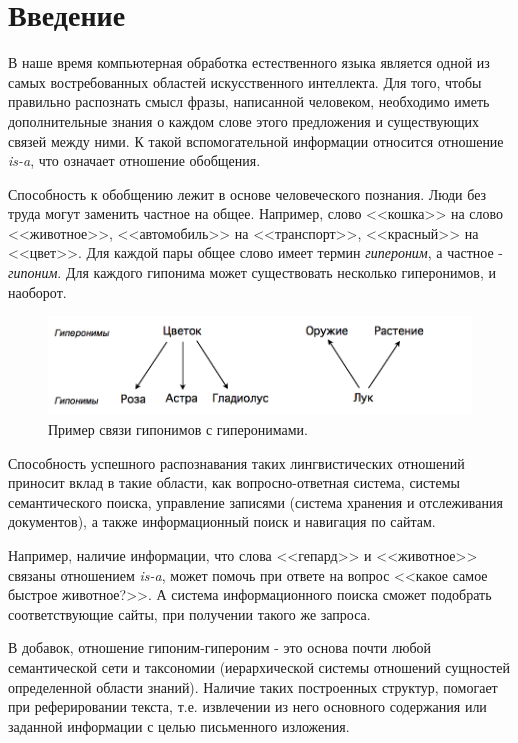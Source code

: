 \section*{Введение}
\label{sec:Introduction} 
\large 

В наше время компьютерная обработка естественного языка является одной из самых
востребованных областей искусственного интеллекта. Для того, чтобы правильно
распознать смысл фразы, написанной человеком, необходимо иметь дополнительные
знания о каждом слове этого предложения и существующих связей между ними. К такой
вспомогательной информации относится отношение \textit{is-a}, что означает отношение
обобщения.

Способность к обобщению лежит в основе человеческого познания. Люди без труда могут
заменить частное на общее. Например, слово <<кошка>> на слово <<животное>>,
<<автомобиль>> на <<транспорт>>, <<красный>> на <<цвет>>. Для каждой пары общее слово имеет
термин \textit{гипероним}, а частное - \textit{гипоним}. Для каждого гипонима может существовать
несколько гиперонимов, и наоборот.


\begin{figure}[ht]
\centering 
    \includegraphics[scale=0.6]{image/Example.png}
    \caption{Пример связи гипонимов с гиперонимами.}
    \label{srg}
\end{figure}



Способность успешного распознавания таких лингвистических отношений приносит вклад
в такие области, как вопросно-ответная система, системы семантического поиска,
управление записями (система хранения и отслеживания документов), а также
информационный поиск и навигация по сайтам.

Например, наличие информации, что слова <<гепард>> и <<животное>> связаны отношением
\textit{is-a}, может помочь при ответе на вопрос <<какое самое быстрое животное?>>. А система
информационного поиска сможет подобрать соответствующие сайты, при получении
такого же запроса.

В добавок, отношение гипоним-гипероним - это основа почти любой семантической сети и
таксономии (иерархической системы отношений сущностей определенной области
знаний). Наличие таких построенных структур, помогает при реферировании текста, т.е.
извлечении из него основного содержания или заданной информации с целью
письменного изложения.

